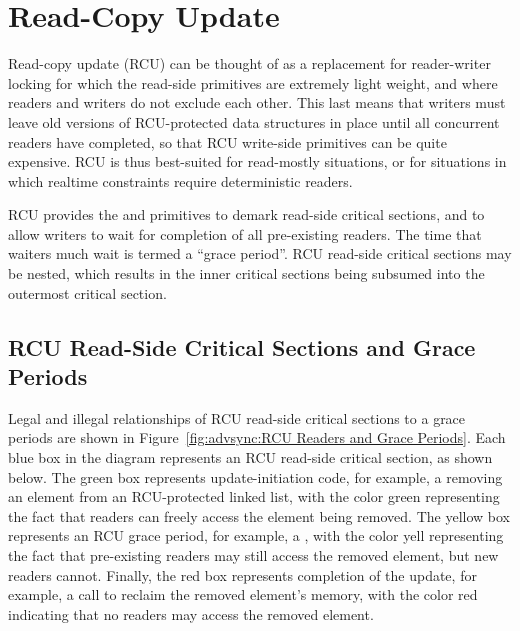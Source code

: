 
\section{Read-Copy Update}
\label{sec:advsync:Read-Copy Update}

Read-copy update (RCU) can be thought of as a replacement for
reader-writer locking for
which the read-side primitives are extremely light weight, and where
readers and writers do not exclude each other.
This last means that writers must leave old versions
of RCU-protected data structures
in place until all concurrent readers have completed,
so that RCU write-side primitives can be quite expensive.
RCU is thus best-suited for read-mostly situations, or for situations
in which realtime constraints require deterministic readers.

RCU provides the  and 
primitives to demark read-side critical sections, and
 to allow writers to wait for completion
of all pre-existing readers.
The time that waiters much wait is termed a ``grace period''.
RCU read-side critical sections may be nested, which results in
the inner critical sections being subsumed into the outermost critical
section.

\subsection{RCU Read-Side Critical Sections and Grace Periods}
\label{sec:advsync:RCU Read-Side Critical Sections and Grace Periods}

Legal and illegal relationships of RCU read-side critical sections
to a grace periods are shown in
Figure~\ref{fig:advsync:RCU Readers and Grace Periods}.
Each blue box in the diagram represents an RCU read-side critical
section, as shown below.
The green box represents update-initiation code, for example, a
 removing an element from an RCU-protected linked list,
with the color green representing the fact that readers can freely
access the element being removed.
The yellow box represents an RCU grace period, for example, a
, with the color yell representing the fact that
pre-existing readers may still access the removed element, but new
readers cannot.
Finally, the red box represents completion
of the update, for example, a  call to reclaim the removed
element's memory, with the color red indicating that no readers may
access the removed element.

